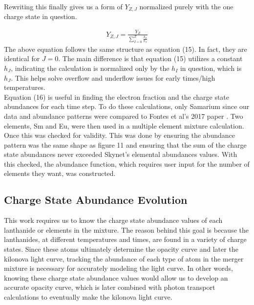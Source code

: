 \documentclass[11pt,a4paper]{article}
\begin{document}
Rewriting this finally gives us a form of $Y_{Z,J}$ normalized purely with the one charge state in question. 

\begin{align}
Y_{Z,J} = \frac{Y_Z}{\displaystyle \sum_{I=0}^{Z} \frac{h_I}{h_J}}
\end{align} 
The above equation follows the same structure as equation (15). In fact, they are identical for $J=$0. The main difference is that equation (15) utilizes a constant $h_J$, indicating the calculation is normalized only by the $h_I$ in question, which is $h_J$. This helps solve overflow and underflow issues for early times/high temperatures. \\

Equation (16) is useful in finding the electron fraction and the charge state abundances for each time step. To do these calculations, only Samarium since our data and abundance patterns were compared to Fontes et al's 2017 paper \cite{Fontes_2017} . Two elements, Sm and Eu, were then used in a multiple element mixture calculation. Once this was checked for validity. This was done by ensuring the abundance pattern was the same shape as figure 11 and ensuring that the sum of the charge state abundances never exceeded Skynet's elemental abundances values. With this checked, the abundance function, which requires user input for the number of elements they want, was constructed. 




\subsection{Charge State Abundance Evolution}

\indent This work requires us to know the charge state abundance values of each lanthanide or elements in the mixture. The reason behind this goal is because the lanthanides, at different temperatures and times, are found in a variety of charge states. Since these atoms ultimately determine the opacity curve and later the kilonova light curve, tracking the abundance of each type of atom in the merger mixture is necessary for accurately modeling the light curve. In other words, knowing these charge state abundance values would allow us to develop an accurate opacity curve, which is later combined with photon transport calculations to eventually make the kilonova light curve.\\ 
\end{document}
